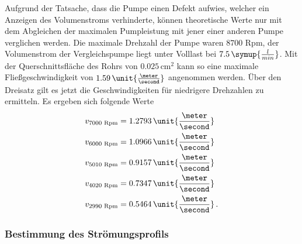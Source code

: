 Aufgrund der Tatsache, dass die Pumpe einen Defekt aufwies, welcher ein Anzeigen des Volumenstroms verhinderte, können theoretische Werte nur mit dem Abgleichen der maximalen Pumpleistung mit jener einer anderen Pumpe verglichen werden.
Die maximale Drehzahl der Pumpe waren $8700$ Rpm, der Volumenstrom der Vergleichspumpe liegt unter Volllast bei $7.5 \,\symup{\frac{l}{min}}$. Mit der Querschnittsfläche des Rohrs von $0.025\, \unit{\centi \meter}^2$ kann so eine maximale Fließgeschwindigkeit von
$1.59 \, \unit{\frac{\meter}{\second}}$ angenommen werden.
Über den Dreisatz gilt es jetzt die Geschwindigkeiten für niedrigere Drehzahlen zu ermitteln.
Es ergeben sich folgende Werte 
\begin{align*}
     v_{7000\text{ Rpm}}&=1.2793\, \unit{\frac{\meter}{\second}}\\
     v_{6000\text{ Rpm}}&=1.0966\, \unit{\frac{\meter}{\second}}\\
     v_{5010\text{ Rpm}}&=0.9157\, \unit{\frac{\meter}{\second}}\\
     v_{4020\text{ Rpm}}&=0.7347\, \unit{\frac{\meter}{\second}}\\
     v_{2990\text{ Rpm}}&=0.5464\, \unit{\frac{\meter}{\second}}\, .\\
\end{align*}
\subsubsection{Bestimmung des Strömungsprofils}  
\label{sec:Profil}

